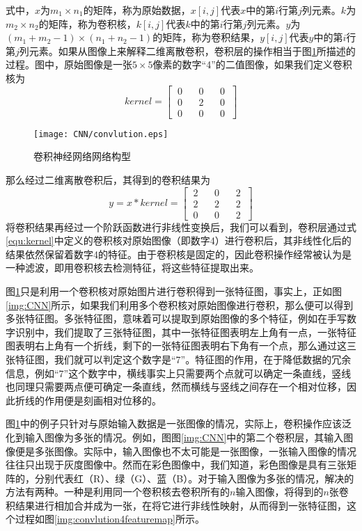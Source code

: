 式中，$x$为$m_1\times n_1$的矩阵，称为原始数据，$x[i,j]$代表$x$中的第$i$行第$j$列元素。$k$为$m_2 \times n_2$的矩阵，称为卷积核，$k[i, j]$代表$k$中的第$i$行第$j$列元素。$y$为$(m_1 + m_2 -1)\times (n_1 + n_2 -1)$的矩阵，称为卷积结果，$y[i, j]$代表$y$中的第$i$行第$j$列元素。如果从图像上来解释二维离散卷积，卷积层的操作相当于图\ref{img:convlution}所描述的过程。图中，原始图像是一张$5\times 5$像素的数字“4”的二值图像，如果我们定义卷积核为
\begin{equation}
kernel = \left[
\begin{array}{ccc}
~0~&~~~0~~~&~0~\\
~0~&~~~2~~~&~0~\\
~0~&~~~0~~~&~0~
\end{array}
\right]\label{equ:kernel}
\end{equation}

\begin{figure}[!htbp]
\centering
\texttt{[image: CNN/convlution.eps]}
\caption{卷积神经网络网络构型}
\label{img:convlution}
\end{figure}

那么经过二维离散卷积后，其得到的卷积结果为
\begin{equation}
y = x * kernel = 
\left[
\begin{array}{ccc}
~2~&~~~0~~~&~2~\\
~2~&~~~2~~~&~2~\\
~0~&~~~0~~~&~2~
\end{array}
\right]
\end{equation}
将卷积结果再经过一个阶跃函数进行非线性变换后，我们可以看到，卷积层通过式\eqref{equ:kernel}中定义的卷积核对原始图像（即数字4）进行卷积后，其非线性化后的结果依然保留着数字4的特征。由于卷积核是固定的，因此卷积操作经常被认为是一种滤波，即用卷积核去检测特征，将这些特征提取出来。

图\ref{img:convlution}只是利用一个卷积核对原始图片进行卷积得到一张特征图，事实上，正如图\ref{img:CNN}所示，如果我们利用多个卷积核对原始图像进行卷积，那么便可以得到多张特征图。多张特征图，意味着可以提取到原始图像的多个特征，例如在手写数字识别中，我们提取了三张特征图，其中一张特征图表明左上角有一点，一张特征图表明右上角有一个折线，剩下的一张特征图表明右下角有一个点，那么通过这三张特征图，我们就可以判定这个数字是“7”。特征图的作用，在于降低数据的冗余信息，例如“7”这个数字中，横线事实上只需要两个点就可以确定一条直线，竖线也同理只需要两点便可确定一条直线，然而横线与竖线之间存在一个相对位移，因此折线的作用便是刻画相对位移的。

图\ref{img:convlution}中的例子只针对与原始输入数据是一张图像的情况，实际上，卷积操作应该泛化到输入图像为多张的情况。例如，图图\ref{img:CNN}中的第二个卷积层，其输入图像便是多张图像。实际中，输入图像也不太可能是一张图像，一张输入图像的情况往往只出现于灰度图像中。然而在彩色图像中，我们知道，彩色图像是具有三张矩阵的，分别代表红（R）、绿（G）、蓝（B）。对于输入图像为多张的情况，解决的方法有两种。一种是利用同一个卷积核去卷积所有的$n$输入图像，将得到的$n$张卷积结果进行相加合并成为一张，在将它进行非线性映射，从而得到一张特征图，这个过程如图\ref{img:convlution4featuremap}所示。


